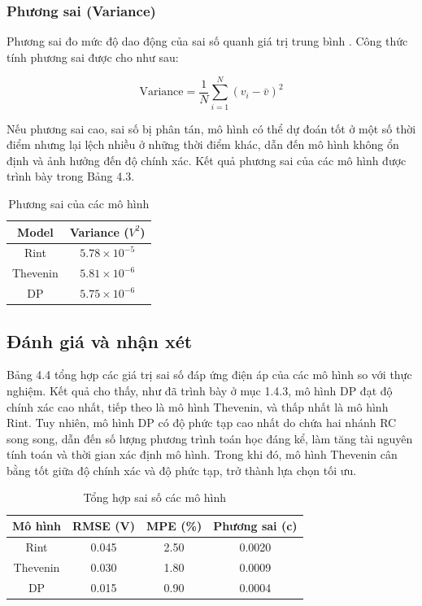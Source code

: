 \documentclass{thesis}
\begin{document}
\subsubsection{Phương sai (Variance)}

Phương sai đo mức độ dao động của sai số quanh giá trị trung bình \cite{he2011}. Công thức tính phương sai được cho như sau:

\begin{equation}
\text{Variance} = \frac{1}{N} \sum_{i=1}^{N} (v_i - \bar{v})^2
\end{equation}

Nếu phương sai cao, sai số bị phân tán, mô hình có thể dự đoán tốt ở một số thời điểm nhưng lại lệch nhiều ở những thời điểm khác, dẫn đến mô hình không ổn định và ảnh hưởng đến độ chính xác. Kết quả phương sai của các mô hình được trình bày trong Bảng 4.3.

\begin{table}[H]
    \centering
    \begin{tabular}{|c|c|}
        \hline
        \textbf{Model} & \textbf{Variance (\(V^2\))} \\
        \hline
        Rint     & \(5.78 \times 10^{-5}\) \\
        Thevenin & \(5.81 \times 10^{-6}\) \\
        DP       & \(5.75 \times 10^{-6}\) \\
        \hline
    \end{tabular}
    \caption{Phương sai của các mô hình}
    \label{tab:variance}
\end{table}


\subsection{Đánh giá và nhận xét}

Bảng 4.4 tổng hợp các giá trị sai số đáp ứng điện áp của các mô hình so với thực nghiệm. Kết quả cho thấy, như đã trình bày ở mục 1.4.3, mô hình DP đạt độ chính xác cao nhất, tiếp theo là mô hình Thevenin, và thấp nhất là mô hình Rint. Tuy nhiên, mô hình DP có độ phức tạp cao nhất do chứa hai nhánh RC song song, dẫn đến số lượng phương trình toán học đáng kể, làm tăng tài nguyên tính toán và thời gian xác định mô hình. Trong khi đó, mô hình Thevenin cân bằng tốt giữa độ chính xác và độ phức tạp, trở thành lựa chọn tối ưu.

\begin{table}[h]
    \centering
    \begin{tabular}{|c|c|c|c|}
        \hline
        Mô hình & RMSE (V)& MPE (\%) & Phương sai (c)\\
        \hline
        Rint & 0.045 & 2.50 & 0.0020 \\
        Thevenin & 0.030 & 1.80 & 0.0009 \\
        DP & 0.015 & 0.90 & 0.0004 \\
        \hline
    \end{tabular}
    \caption{Tổng hợp sai số các mô hình}
    \label{tab:summary}
\end{table}
\end{document}
